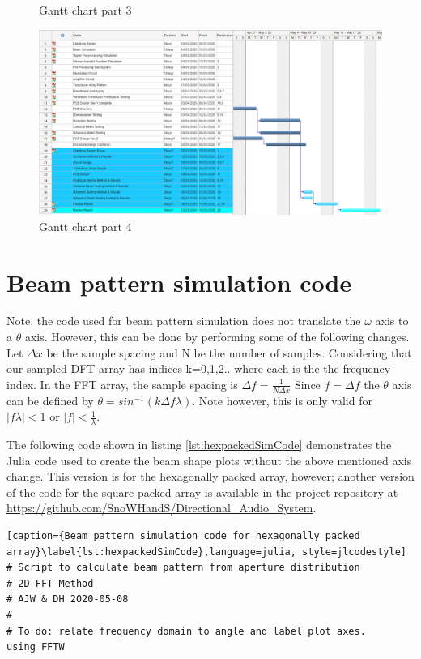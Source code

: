 \begin{appendices}
\begin{figure}[ht]
    \caption{Gantt chart part 3}
    \label{fig:gantt3}
\end{figure}
\begin{figure}[ht]
    \centering
    \includegraphics[width=\textwidth]{Figures/Gantt4.PNG}
    \caption{Gantt chart part 4}
    \label{fig:gantt4}
\end{figure}

\clearpage

\section{Beam pattern simulation code}
Note, the code used for beam pattern simulation does not translate the $\omega$ axis to a $\theta$ axis. However, this can be done by performing some of the following changes.\\
Let $\Delta x$ be the sample spacing and N be the number of samples. Considering that our sampled DFT array has indices k=0,1,2.. where each is the the frequency index. In the FFT array, the sample spacing is $\Delta f=\frac{1}{N\Delta x}$
Since $f=\Delta f$  the $\theta$ axis can be defined by $\theta = sin^{-1}(k\Delta f \lambda)$.
Note however, this is only valid for $\left|f \lambda \right | < 1 $ or $\left |f\right | < \frac{1}{\lambda} $.






%
The following code shown in listing \ref{lst:hexpackedSimCode} demonstrates the Julia code used to create the beam shape plots without the above mentioned axis change. This version is for the hexagonally packed array, however; another version of the code for the square packed array is available in the project repository at \url{https://github.com/SnoWHandS/Directional_Audio_System}.
\begin{lstlisting}[caption={Beam pattern simulation code for hexagonally packed array}\label{lst:hexpackedSimCode},language=julia, style=jlcodestyle]
# Script to calculate beam pattern from aperture distribution
# 2D FFT Method
# AJW & DH 2020-05-08
#
# To do: relate frequency domain to angle and label plot axes.
using FFTW


\end{lstlisting}
\end{appendices}
